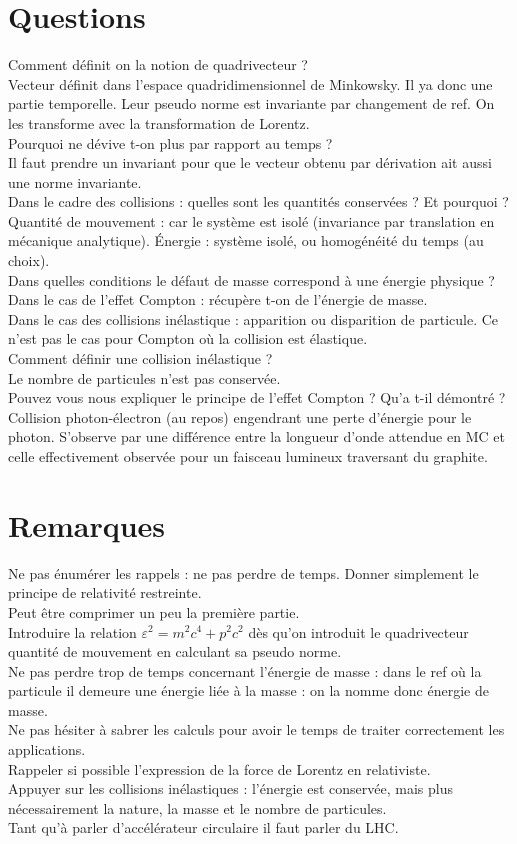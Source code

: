 \documentclass[12pt,prb,aps,epsf]{article}
\begin{document}
\section*{Questions}
Comment définit on la notion de quadrivecteur ?\\
Vecteur définit dans l'espace quadridimensionnel de Minkowsky. Il ya donc une partie temporelle. Leur pseudo norme est invariante par changement de ref. On les transforme avec la transformation de Lorentz.\\

Pourquoi ne dévive t-on plus par rapport au temps ?\\
Il faut prendre un invariant pour que le vecteur obtenu par dérivation ait aussi une norme invariante.\\

Dans le cadre des collisions : quelles sont les quantités conservées ? Et pourquoi ?\\
Quantité de mouvement : car le système est isolé (invariance par translation en mécanique analytique). Énergie : système isolé, ou homogénéité du temps (au choix).\\

Dans quelles conditions le défaut de masse correspond à une énergie physique ? Dans le cas de l'effet Compton : récupère t-on de l'énergie de masse.\\
Dans le cas des collisions inélastique : apparition ou disparition de particule. Ce n'est pas le cas pour Compton où la collision est élastique.\\

Comment définir une collision inélastique ?\\
Le nombre de particules n'est pas conservée.\\

Pouvez vous nous expliquer le principe de l'effet Compton ? Qu'a t-il démontré ?\\
Collision photon-électron (au repos) engendrant une perte d'énergie pour le photon. S'observe par une différence entre la longueur d'onde attendue en MC et celle effectivement observée pour un faisceau lumineux traversant du graphite.

\section*{Remarques}
Ne pas énumérer les rappels : ne pas perdre de temps. Donner simplement le principe de relativité restreinte.\\
Peut être comprimer un peu la première partie.\\
Introduire la relation $\varepsilon^2 = m^2c^4 + p^2c^2$ dès qu'on introduit le quadrivecteur quantité de mouvement en calculant sa pseudo norme.\\
Ne pas perdre trop de temps concernant l'énergie de masse : dans le ref où la particule il demeure une énergie liée à la masse : on la nomme donc énergie de masse.\\
Ne pas hésiter à sabrer les calculs pour avoir le temps de traiter correctement les applications.\\

Rappeler si possible l'expression de la force de Lorentz en relativiste.\\

Appuyer sur les collisions inélastiques : l'énergie est conservée, mais plus nécessairement la nature, la masse et le nombre de particules.\\

Tant qu'à parler d'accélérateur circulaire il faut parler du LHC.
\end{document}
